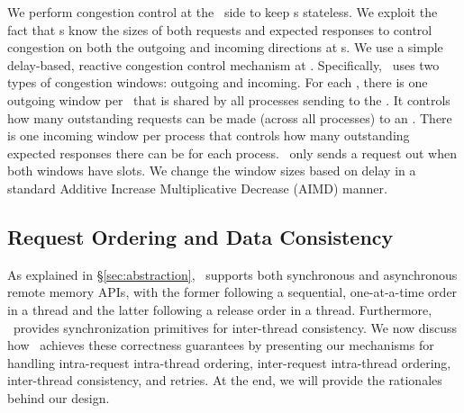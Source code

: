 
We perform congestion control at the \CN\ side to keep \MN{}s stateless.
We exploit the fact that \CN{}s know the sizes of both requests and expected responses
to control congestion on both the outgoing and incoming directions at \CN{}s.
We use a simple delay-based, reactive congestion control mechanism at \syslib.
Specifically, \syslib\ uses two types of congestion windows: outgoing and incoming.
For each \CN, there is one outgoing window per \MN\ that is shared by all processes sending to the \MN.
It controls how many outstanding requests can be made (across all processes) to an \MN.
There is one incoming window per process that controls how many outstanding expected responses there can be for each process.
\syslib\ only sends a request out when both windows have slots.
We change the window sizes based on delay in a standard Additive Increase Multiplicative Decrease (AIMD) manner.
\fi

\subsection{Request Ordering and Data Consistency}
\label{sec:ordering}

As explained in \S\ref{sec:abstraction}, \sys\ supports both synchronous and asynchronous remote memory APIs, with the former following a sequential, one-at-a-time order in a thread and the latter following a release order in a thread.
Furthermore, \sys\ provides synchronization primitives for inter-thread consistency.
We now discuss how \sys\ achieves these correctness guarantees by presenting our mechanisms for handling intra-request intra-thread ordering, inter-request intra-thread ordering, inter-thread consistency, and retries.
At the end, we will provide the rationales behind our design.

